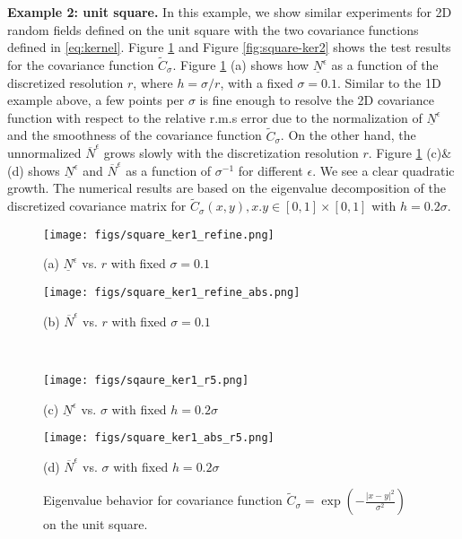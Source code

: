 \documentclass[11pt]{amsart}
\begin{document}
{\bf Example 2: unit square.} In this example, we show similar experiments for 2D random fields defined on the unit square with the two covariance functions defined in \eqref{eq:kernel}. Figure \ref{fig:square-ker1}  and Figure \ref{fig:square-ker2} shows the test results for the covariance function $\tilde{C}_{\sigma}$.  Figure \ref{fig:square-ker1} (a) shows how $\underline{N}^{\epsilon}$ as a function of the discretized resolution $r$, where $h=\sigma/r$, with a fixed $\sigma=0.1$. Similar to the 1D example above, a few points per $\sigma$ is fine enough to resolve the 2D covariance function with respect to the relative r.m.s error due to the normalization of  $\underline{N}^{\epsilon}$ and the smoothness of the covariance function $\tilde{C}_{\sigma}$. On the other hand, the unnormalized $\overline{N}^{\epsilon}$ grows slowly with the discretization resolution $r$. Figure \ref{fig:square-ker1} (c)\&(d) shows $\underline{N}^{\epsilon}$ and $\overline{N}^{\epsilon}$ as a function of $\sigma^{-1}$ for different $\epsilon$. We see a clear quadratic growth. The numerical results are based on the eigenvalue decomposition of the discretized covariance matrix for  $\tilde{C}_{\sigma}(x,y), x.y \in [0,1]\times[0,1]$ with $h=0.2\sigma$. 

\begin{figure}[!htb]
	\begin{center}
		\hspace{-0.6cm}
		\begin{minipage}{0.46\textwidth}
			\texttt{[image: figs/square\_ker1\_refine.png]}
			\caption*{(a) $\underline{N}^{\epsilon}$ vs. $r$ with fixed $\sigma=0.1$}
		\end{minipage}
		\hfil
		\begin{minipage}{0.46\textwidth}
			\texttt{[image: figs/square\_ker1\_refine\_abs.png]}
			\caption*{(b) $\overline{N}^{\epsilon}$ vs. $r$ with fixed $\sigma=0.1$}
		\end{minipage}
		\\
		\vspace{0.3cm}
		\hspace{-0.6cm}
		\begin{minipage}{0.46\textwidth}
			\texttt{[image: figs/sqaure\_ker1\_r5.png]}
			\caption*{(c) $\underline{N}^{\epsilon}$ vs. $\sigma$ with fixed $h=0.2\sigma$}
		\end{minipage}
		\hfil
		\begin{minipage}{0.46\textwidth}
			\texttt{[image: figs/square\_ker1\_abs\_r5.png]}
			\caption*{(d) $\overline{N}^{\epsilon}$ vs. $\sigma$ with fixed $h=0.2\sigma$}
		\end{minipage}
		\caption{Eigenvalue behavior for covariance function $\tilde{C}_{\sigma}=\exp(-\frac{|x-y|^2}{\sigma^2})$ on the unit square.}
		\label{fig:square-ker1}
	\end{center}
\end{figure}
\end{document}
